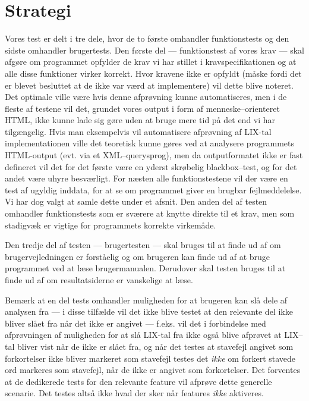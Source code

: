 \documentclass[a4paper,oneside,article]{memoir}
\begin{document}
\chapter{Strategi}
Vores test er delt i tre dele, hvor de to første omhandler
funktionstests og den sidste omhandler brugertests. Den første del ---
funktionstest af vores krav --- skal afgøre om programmet opfylder de
krav vi har stillet i kravspecifikationen og at alle disse funktioner
virker korrekt. Hvor kravene ikke er opfyldt (måske fordi det er
blevet besluttet at de ikke var værd at implementere) vil dette blive
noteret. Det optimale ville være hvis denne afprøvning kunne
automatiseres, men i de fleste af testene vil det, grundet vores
output i form af menneske--orienteret HTML, ikke kunne lade sig gøre
uden at bruge mere tid på det end vi har tilgængelig. Hvis man
eksempelvis vil automatisere afprøvning af LIX-tal implementationen
ville det teoretisk kunne gøres ved at analysere programmets
HTML-output (evt. via et XML--querysprog), men da outputformatet ikke
er fast defineret vil det for det første være en yderst skrøbelig
blackbox--test, og for det andet være uhyre besværligt. For næsten alle
funktionstestene vil der være en test af ugyldig inddata, for at se om
programmet giver en brugbar fejlmeddelelse. Vi har dog valgt at samle
dette under et afsnit. Den anden del af testen omhandler
funktionstests som er sværere at knytte direkte til et krav, men som
stadigvæk er vigtige for programmets korrekte virkemåde.

Den tredje del af testen --- brugertesten --- skal bruges til at finde
ud af om brugervejledningen er forståelig og om brugeren kan finde ud
af at bruge programmet ved at læse brugermanualen. Derudover skal
testen bruges til at finde ud af om resultatsiderne er vanskelige at
læse.

Bemærk at en del tests omhandler muligheden for at brugeren kan slå
dele af analysen fra --- i disse tilfælde vil det ikke blive testet at
den relevante del ikke bliver slået fra når det ikke er angivet ---
f.eks. vil det i forbindelse med afprøvningen af muligheden for at slå
LIX-tal fra ikke også blive afprøvet at LIX--tal bliver vist når de
ikke er slået fra, og når det testes at stavefejl angivet som
forkortelser ikke bliver markeret som stavefejl testes det
\textit{ikke} om forkert stavede ord markeres som stavefejl, når de
ikke er angivet som forkortelser. Det forventes at de dedikerede tests
for den relevante feature vil afprøve dette generelle scenarie. Det
testes altså ikke hvad der sker når features \textit{ikke} aktiveres.
\end{document}
